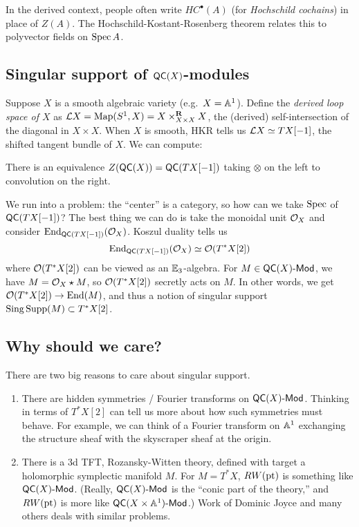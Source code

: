 \documentclass{article}
\begin{document}
In the derived context, people often write $HC^\bullet(A)$ (for \emph{Hochschild cochains}) in place of $Z(A)$.
The Hochschild-Kostant-Rosenberg theorem relates this to polyvector fields on $\Spec A$.

\subsection{Singular support of $\QC(X)$-modules}

Suppose $X$ is a smooth algebraic variety (e.g.\ $X = \AA^1$).
Define the \emph{derived loop space of $X$} as $\Lc X = \Map(S^1, X) = X \times^{\Rbf}_{X \times X} X$, the (derived) self-intersection of the diagonal in $X \times X$.
When $X$ is smooth, HKR tells us $\Lc X \simeq TX[-1]$, the shifted tangent bundle of $X$.
We can compute:

\begin{thm}
	There is an equivalence $Z(\QC(X)) = \QC(TX[-1])$ taking $\otimes$ on the left to convolution on the right.
\end{thm}

We run into a problem: the ``center'' is a category, so how can we take $\Spec$ of $\QC(TX[-1])$?
The best thing we can do is take the monoidal unit $\Oc_X$ and consider $\End_{\QC(TX[-1])}(\Oc_X)$.
Koszul duality tells us
\[
	\End_{\QC(TX[-1])}(\Oc_X) \simeq \Oc(T^* X[2])
\]
where $\Oc(T^* X[2])$ can be viewed as an $\EE_3$-algebra.
For $M \in \QC(X)\dMod$, we have $M = \Oc_X \star M$, so $\Oc(T^* X[2])$ secretly acts on $M$.
In other words, we get $\Oc(T^* X[2]) \to \End(M)$, and thus a notion of singular support $\Sing\Supp(M) \subset T^*X[2]$.

\subsection{Why should we care?}

There are two big reasons to care about singular support.

\begin{enumerate}
	\item There are hidden symmetries / Fourier transforms on $\QC(X)\dMod$.
		Thinking in terms of $T^*X[2]$ can tell us more about how such symmetries must behave.
		For example, we can think of a Fourier transform on $\AA^1$ exchanging the structure sheaf with the skyscraper sheaf at the origin.
	\item There is a 3d TFT, Rozansky-Witten theory, defined with target a holomorphic symplectic manifold $M$.
		For $M = T^*X$, $RW(\pt)$ is something like $\QC(X)\dMod$.
		(Really, $\QC(X)\dMod$ is the ``conic part of the theory,'' and $RW(\pt)$ is more like $\QC(X \times \AA^1)\dMod$.)
		Work of Dominic Joyce and many others deals with similar problems.
\end{enumerate}
\end{document}

